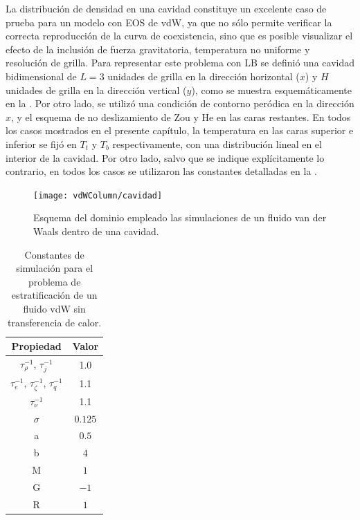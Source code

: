 La distribuci\'on de densidad en una cavidad constituye un excelente caso de prueba para un modelo \pp{} con EOS de vdW, ya que no s\'olo permite verificar la correcta reproducci\'on de la curva de coexistencia, sino que es posible visualizar el efecto de la inclusi\'on de fuerza gravitatoria, temperatura no uniforme y resoluci\'on de grilla. Para representar este problema con LB se defini\'o una cavidad bidimensional de $L=3$ unidades de grilla en la direcci\'on horizontal ($x$) y $H$ unidades de grilla en la direcci\'on vertical ($y$), como se muestra esquem\'aticamente en la . Por otro lado, se utiliz\'o una condici\'on de contorno per\'odica en la direcci\'on $x$, y el esquema de no deslizamiento de Zou y He en las caras restantes. En todos los casos mostrados en el presente cap\'itulo, la temperatura en las caras superior e inferior se fij\'o en $T_t$ y $T_b$ respectivamente, con una distribuci\'on lineal en el interior de la cavidad. Por otro lado, salvo que se indique expl\'icitamente lo contrario, en todos los casos se utilizaron las constantes detalladas en la .


\begin{figure}[ht]
	\centering
	\texttt{[image: vdWColumn/cavidad]}
	\caption{Esquema del dominio empleado las simulaciones de un fluido van der Waals dentro de una cavidad.}
	\label{fig:vdWColumn_cavidad}
\end{figure}

\begin{table}[ht]
	\centering
    \begin{tabular}{c c}
	    \toprule
        \bf Propiedad & \bf Valor \\
        \midrule
        $\tau_{\rho}^{-1}$, $\tau_{j}^{-1}$ & 1.0\\
        $\tau_{e}^{-1}$, $\tau_{\zeta}^{-1}$, $\tau_{q}^{-1}$ & 1.1 \\
        $\tau_{\nu}^{-1}$ & 1.1 \\
        $\sigma$ & $0.125$ \\
		a & $0.5$ \\
		b & $4$ \\
		M & $1$ \\
		G & $-1$ \\
		R & $1$ \\
        \bottomrule
	\end{tabular}
	\caption{Constantes de simulaci\'on para el problema de estratificaci\'on de un fluido vdW sin transferencia de calor.}
	\label{tab:vdW_isot}
\end{table}  
\FloatBarrier


